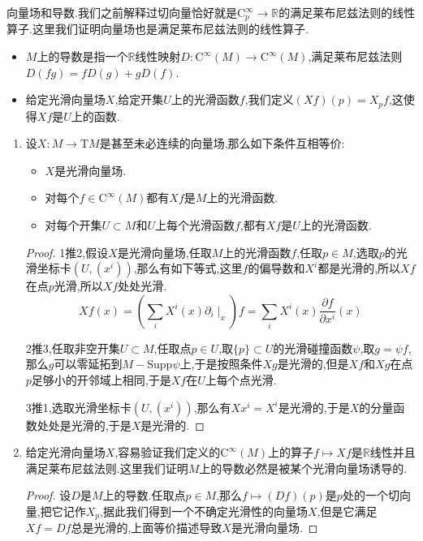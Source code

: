 向量场和导数.我们之前解释过切向量恰好就是$\mathrm{C}^{\infty}_p\to\mathbb{R}$的满足莱布尼兹法则的线性算子.这里我们证明向量场也是满足莱布尼兹法则的线性算子.
\begin{itemize}
	\item $M$上的导数是指一个$\mathbb{R}$线性映射$D:\mathrm{C}^{\infty}(M)\to\mathrm{C}^{\infty}(M)$,满足莱布尼兹法则$D(fg)=fD(g)+gD(f)$.
	\item 给定光滑向量场$X$,给定开集$U$上的光滑函数$f$,我们定义$(Xf)(p)=X_pf$,这使得$Xf$是$U$上的函数.
\end{itemize}
\begin{enumerate}
	\item 设$X:M\to\mathrm{T}M$是甚至未必连续的向量场,那么如下条件互相等价:
	\begin{itemize}
		\item $X$是光滑向量场.
		\item 对每个$f\in\mathrm{C}^{\infty}(M)$都有$Xf$是$M$上的光滑函数.
		\item 对每个开集$U\subset M$和$U$上每个光滑函数$f$,都有$Xf$是$U$上的光滑函数.
	\end{itemize}
    \begin{proof}
    	
    	1推2,假设$X$是光滑向量场,任取$M$上的光滑函数$f$,任取$p\in M$,选取$p$的光滑坐标卡$(U,(x^i))$,那么有如下等式,这里$f$的偏导数和$X^i$都是光滑的,所以$Xf$在点$p$光滑,所以$Xf$处处光滑.
    	$$Xf(x)=\left(\sum_iX^i(x)\partial_i\mid_x\right)f=\sum_iX^i(x)\frac{\partial f}{\partial x^i}(x)$$
    	
    	2推3,任取非空开集$U\subset M$,任取点$p\in U$,取$\{p\}\subset U$的光滑碰撞函数$\psi$,取$g=\psi f$,那么$g$可以零延拓到$M-\mathrm{Supp}\psi$上,于是按照条件$Xg$是光滑的,但是$Xf$和$Xg$在点$p$足够小的开邻域上相同,于是$Xf$在$U$上每个点光滑.
    	
    	3推1,选取光滑坐标卡$(U,(x^i))$,那么有$Xx^i=X^i$是光滑的,于是$X$的分量函数处处是光滑的,于是$X$是光滑的.
    \end{proof}
    \item 给定光滑向量场$X$,容易验证我们定义的$\mathrm{C}^{\infty}(M)$上的算子$f\mapsto Xf$是$\mathbb{R}$线性并且满足莱布尼兹法则.这里我们证明$M$上的导数必然是被某个光滑向量场诱导的.
    \begin{proof}
    	
    	设$D$是$M$上的导数.任取点$p\in M$,那么$f\mapsto (Df)(p)$是$p$处的一个切向量,把它记作$X_p$,据此我们得到一个不确定光滑性的向量场$X$,但是它满足$Xf=Df$总是光滑的,上面等价描述导致$X$是光滑向量场.
    \end{proof}
\end{enumerate}

